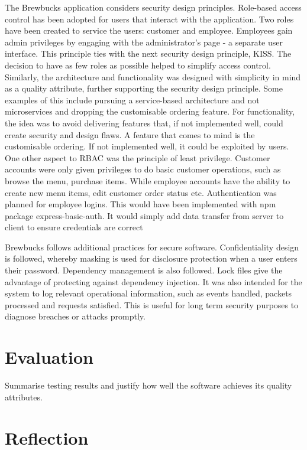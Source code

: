 \documentclass{article}
\begin{document}
\medskip \noindent The Brewbucks application considers security design principles. Role-based access control has been adopted for users that interact with the application. Two roles have been created to service the users: customer and employee. Employees gain admin privileges by engaging with the administrator's page - a separate user interface. This principle ties with the next security design principle, KISS. The decision to have as few roles as possible helped to simplify access control. Similarly, the architecture and functionality was designed with simplicity in mind as a quality attribute, further supporting the security design principle. Some examples of this include pursuing a service-based architecture and not microservices and dropping the customisable ordering feature. For functionality, the idea was to avoid delivering features that, if not implemented well, could create security and design flaws. A feature that comes to mind is the customisable ordering. If not implemented well, it could be exploited by users. One other aspect to RBAC was the principle of least privilege. Customer accounts were only given privileges to do basic customer operations, such as browse the menu, purchase items. While employee accounts have the ability to create new menu items, edit customer order status etc. Authentication was planned for employee logins. This would have been implemented with npm package express-basic-auth. It would simply add data transfer from server to client to ensure credentials are correct

\medskip \noindent Brewbucks follows additional practices for secure software. Confidentiality design is followed, whereby masking is used for disclosure protection when a user enters their password. Dependency management is also followed. Lock files give the advantage of protecting against dependency injection. It was also intended for the system to log relevant operational information, such as events handled, packets processed and requests satisfied. This is useful for long term security purposes to diagnose breaches or attacks promptly.

\section{Evaluation}
Summarise testing results and justify how well the software achieves its quality attributes.
\section{Reflection}
\end{document}
